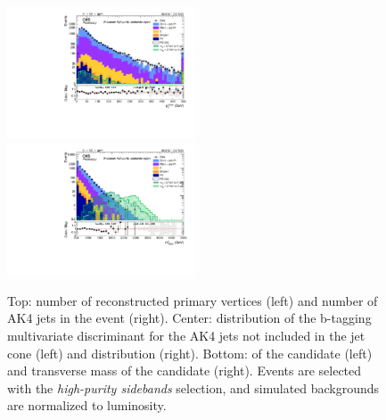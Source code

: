 \begin{figure}[!htb]
\begin{center}
    \includegraphics[width=0.495\textwidth]{plots/v9_U/XVZnnhpSB/X_pt.pdf}
    \includegraphics[width=0.495\textwidth]{plots/v9_U/XVZnnhpSB/X_tmass.pdf}

    \caption{Top: number of reconstructed primary vertices (left) and number of AK4 jets in the event (right). Center: distribution of the b-tagging multivariate discriminant for the AK4 jets not included in the \V jet cone (left) and \MET distribution (right). Bottom: \pt of the \VZ candidate (left) and transverse mass of the \VZ candidate (right). Events are selected with the \emph{high-purity sidebands} selection, and simulated backgrounds are normalized to luminosity.}
  \end{center}
\end{figure}



